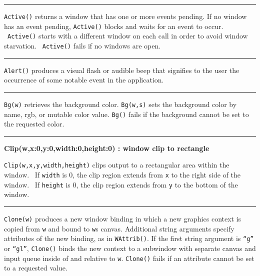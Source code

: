 \bigskip\hrule\vspace{0.1cm}

\noindent
\texttt{Active()} returns a window that has one or more events pending.
If no window has an event pending, \texttt{Active()} blocks and waits
for an event to occur. \ \texttt{Active()} starts with a different
window on each call in order to avoid window
{\textquotedbl}starvation{\textquotedbl}. \ \texttt{Active()} fails if
no windows are open.

\bigskip\hrule\vspace{0.1cm}

\noindent
\texttt{Alert()} produces a visual flash or audible beep that signifies
to the user the occurrence of some notable event in the application.

\bigskip\hrule\vspace{0.1cm}

\noindent
\texttt{Bg(w)} retrieves the background color. \texttt{Bg(w,s)} sets the
background color by name, rgb, or mutable color value. \texttt{Bg()}
fails if the background cannot be set to the requested color.

\bigskip\hrule\vspace{0.1cm}
\noindent
{\bf Clip(w,x:0,y:0,width:0,height:0) : window \hfill clip to rectangle}

\noindent
\texttt{Clip(w,x,y,width,height)} clips output to a rectangular area
within the window. \ If \texttt{width} is 0, the clip region extends
from \texttt{x} to the right side of the window. \ If \texttt{height}
is 0, the clip region extends from \texttt{y} to the bottom of the
window.

\bigskip\hrule\vspace{0.1cm}

\noindent
\texttt{Clone(w)} produces a new window binding in which a new graphics
context is copied from \texttt{w} and bound to
\texttt{w}{\textquotesingle}s canvas. Additional string arguments
specify attributes of the new binding, as in \texttt{WAttrib()}. If the
first string argument is
\texttt{{\textquotedblleft}g{\textquotedblright}} or
\texttt{{\textquotedblleft}gl{\textquotedblright}}, \texttt{Clone()}
binds the new context to a subwindow with separate canvas and input
queue inside of and relative to \texttt{w}. \texttt{Clone()} fails if
an attribute cannot be set to a requested value.


